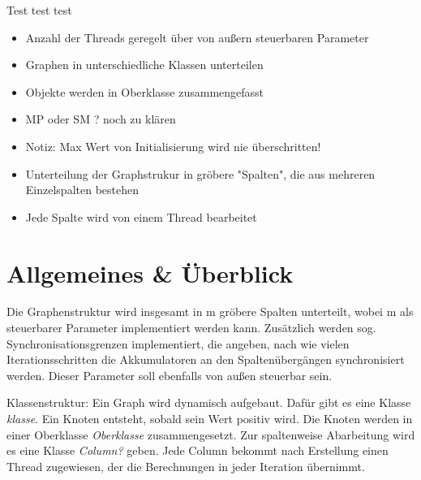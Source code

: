 
\usepackage{pdfpages}
\usepackage{listings}



\newcommand{\subttl}{\textbf{Milestone 1}}
\newcommand{\StudNameOne}{Jens Heinen (2542182)}
\newcommand{\StudNameTwo}{Lukas Schaal (2539218)}
\newcommand{\StudNameThree}{Christoph Rosenhauer (2549220)}

\newcommand{\ndt}{Nichtdeterminismus }
Test test test

\begin{itemize}
	\item Anzahl der Threads geregelt über von außern steuerbaren Parameter
	\item Graphen in unterschiedliche Klassen unterteilen
	\item Objekte werden in Oberklasse zusammengefasst 
	\item MP oder SM ? noch zu klären
	\item Notiz: Max Wert von Initialisierung wird nie überschritten!
	\item Unterteilung der Graphstrukur in gröbere "Spalten", die aus mehreren Einzelspalten bestehen
	\item Jede Spalte wird von einem Thread bearbeitet
	
\end{itemize}


\section{Allgemeines \& Überblick}
Die Graphenstruktur wird insgesamt in m gröbere Spalten unterteilt, wobei m als steuerbarer Parameter implementiert werden kann. Zusätz\-lich werden sog. Synchronisationsgrenzen implementiert, die angeben, nach wie vielen Iterationsschritten die Akkumulatoren an den Spaltenübergängen synchronisiert werden. Dieser Parameter soll ebenfalls von außen steuerbar sein. 

Klassenstruktur: 
Ein Graph wird dynamisch aufgebaut. Dafür gibt es eine Klasse \textit{klasse}. Ein Knoten entsteht, sobald sein Wert positiv wird. Die Knoten werden in einer Oberklasse \textit{Oberklasse} zusammengesetzt. Zur spaltenweise Abarbeitung wird es eine Klasse \textit{Column?} geben. Jede Column bekommt nach Erstellung einen Thread zugewiesen, der die Berechnungen in jeder Iteration übernimmt. 

